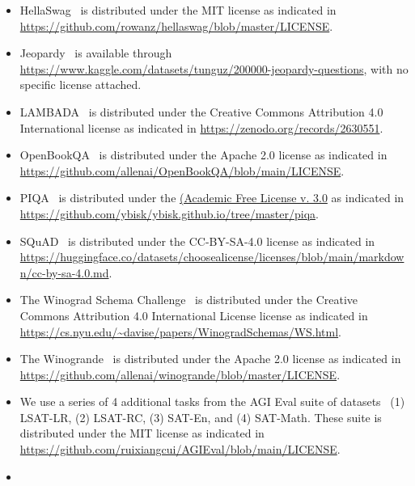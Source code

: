\documentclass{article}
\begin{document}
\begin{itemize}
\begin{itemize}
        \item Middle/High school exam passages are collected from RACE which comes with its own license.
        \item News passages are collected from the DeepMind CNN dataset which comes with Apache license.
        \end{itemize}
    \item
    HellaSwag~\citep{hellaswag}  is distributed under the MIT license as indicated in \url{https://github.com/rowanz/hellaswag/blob/master/LICENSE}.
    \item
    Jeopardy~\citep{kaggle200000Jeopardy} is available through \url{https://www.kaggle.com/datasets/tunguz/200000-jeopardy-questions}, with no specific license attached.
    \item
    LAMBADA~\citep{lambada}  is distributed under the Creative Commons Attribution 4.0 International license as indicated in \url{https://zenodo.org/records/2630551}.
    \item
    OpenBookQA~\citep{OpenBookQA2018} is distributed under the Apache 2.0 license as indicated in \url{https://github.com/allenai/OpenBookQA/blob/main/LICENSE}.
    \item
    PIQA~\citep{piqa}  is distributed under the \href{https://opensource.org/licenses/AFL-3.0}{(Academic Free License v. 3.0} as indicated in \url{https://github.com/ybisk/ybisk.github.io/tree/master/piqa}.
    \item
    SQuAD~\citep{squad}  is distributed under the CC-BY-SA-4.0 license as indicated in \url{https://huggingface.co/datasets/choosealicense/licenses/blob/main/markdown/cc-by-sa-4.0.md}.
    \item
    The Winograd Schema Challenge~\citep{winograd} is distributed under the Creative Commons Attribution 4.0 International License license as indicated in \url{https://cs.nyu.edu/~davise/papers/WinogradSchemas/WS.html}.
    \item
    The Winogrande~\citep{sakaguchi2019winogrande}  is distributed under the Apache 2.0 license as indicated in \url{https://github.com/allenai/winogrande/blob/master/LICENSE}.
    \item
    We use a series of 4 additional tasks from the AGI Eval suite of datasets~\citep{zhong2023agieval} (1) LSAT-LR, (2) LSAT-RC, (3) SAT-En, and (4) SAT-Math. These suite  is distributed under the MIT license as indicated in \url{https://github.com/ruixiangcui/AGIEval/blob/main/LICENSE}.
    \item

\end{itemize}
\end{document}
